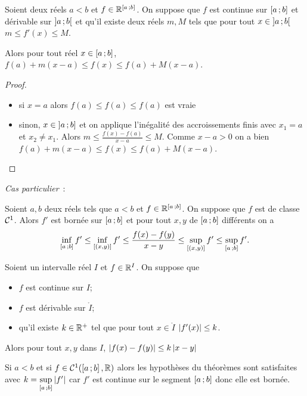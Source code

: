 \begin{corth}
  Soient deux réels $a < b$ et $f \in \mathbb{R}^{\left[ a \, ;  b \right]}$. On suppose que $f$ est continue sur $\left[ a \, ;  b \right]$ et dérivable sur $\left] a \, ;  b \right[$ et qu'il existe deux réels $m,M$ tels que pour tout $x \in \left] a \, ;  b \right[$ $m \leq f'(x) \leq M$.

Alors pour tout réel $x \in \left[ a \, ;  b \right]$, $f(a)+m(x-a) \leq f(x) \leq f(a)+M(x-a)$.
\end{corth}\label{corth:iaf2}
\begin{proof}
  \begin{itemize}
  \item si $x=a$ alors $f(a) \leq f(a) \leq f(a)$ est vraie
  \item sinon, $x \in \left] a \, ;  b \right]$ et on applique l'inégalité des accroissements finis avec $x_1=a$ et $x_2 \neq x_1$. Alors $m \leq \frac{f(x)-f(a)}{x-a} \leq M$. Comme $x-a >0$ on a bien $f(a)+m(x-a) \leq f(x) \leq f(a)+M(x-a)$.
  \end{itemize}
\end{proof}

\emph{Cas particulier}~:

\begin{prop}
  Soient $a, b$ deux réels tels que $a < b$ et $f \in \mathbb{R}^{\left[ a \, ;  b \right]}$. On suppose que $f$ est de classe $\mathcal{C}^{1}$. Alors $f'$ est bornée sur $\left[ a \, ;  b \right]$ et pour tout $x,y$ de $\left[ a \, ;  b \right]$ différents on a
  \begin{equation}
    \inf\limits_{\left[ a \, ;  b \right]}f' \leq \inf\limits_{[(x,y)]}f' \leq \frac{f(x)-f(y)}{x-y} \leq \sup\limits_{[(x,y)]}f' \leq \sup\limits_{\left[ a \, ;  b \right]}f'.
  \end{equation}
\end{prop}
\begin{theo}
  Soient un intervalle réel $I$ et $f \in \mathbb{R}^I$. On suppose que
  \begin{itemize}
  \item $f$ est continue sur $I$;
  \item $f$ est dérivable sur $\mathring{I}$;
  \item qu'il existe $k \in \mathbb{R}^{+}$ tel que pour tout $x \in \mathring{I}$ $\left\lvert f'(x)\right\rvert \leq k$.
  \end{itemize}
  Alors pour tout $x,y$ dans $I$, $\left\lvert f(x)-f(y)\right\rvert \leq k\left\lvert x-y\right\rvert$
\end{theo}

Si $a < b$ et si $f \in \mathcal{C}^{1}(\left[ a \, ;  b \right], \mathbb{R})$ alors les hypothèses du théorèmes sont satisfaites avec $k=\sup\limits_{\left[ a \, ;  b \right]}\left\lvert f'\right\rvert$ car $f'$ est continue sur le segment $\left[ a \, ;  b \right]$ donc elle est bornée.

